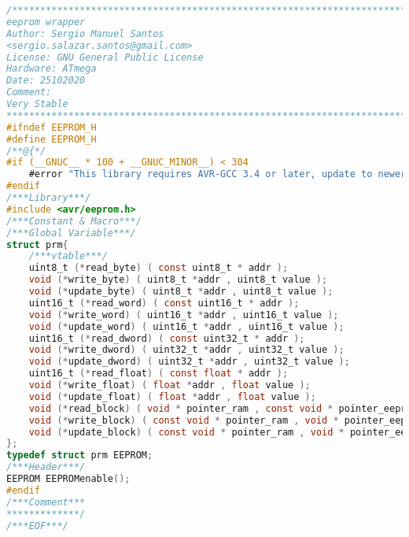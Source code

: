 \begin{lstlisting}[language=C]
/*************************************************************************
eeprom wrapper
Author: Sergio Manuel Santos
<sergio.salazar.santos@gmail.com>
License: GNU General Public License
Hardware: ATmega
Date: 25102020
Comment:
Very Stable
*************************************************************************/
#ifndef EEPROM_H
#define EEPROM_H
/**@{*/
#if (__GNUC__ * 100 + __GNUC_MINOR__) < 304
	#error "This library requires AVR-GCC 3.4 or later, update to newer AVR-GCC compiler !"
#endif
/***Library***/
#include <avr/eeprom.h>
/***Constant & Macro***/
/***Global Variable***/
struct prm{
	/***vtable***/
	uint8_t (*read_byte) ( const uint8_t * addr );
	void (*write_byte) ( uint8_t *addr , uint8_t value );
	void (*update_byte) ( uint8_t *addr , uint8_t value );
	uint16_t (*read_word) ( const uint16_t * addr );
	void (*write_word) ( uint16_t *addr , uint16_t value );
	void (*update_word) ( uint16_t *addr , uint16_t value );
	uint16_t (*read_dword) ( const uint32_t * addr );
	void (*write_dword) ( uint32_t *addr , uint32_t value );
	void (*update_dword) ( uint32_t *addr , uint32_t value );
	uint16_t (*read_float) ( const float * addr );
	void (*write_float) ( float *addr , float value );
	void (*update_float) ( float *addr , float value );
	void (*read_block) ( void * pointer_ram , const void * pointer_eeprom , size_t n);
	void (*write_block) ( const void * pointer_ram , void * pointer_eeprom , size_t n);
	void (*update_block) ( const void * pointer_ram , void * pointer_eeprom , size_t n);
};
typedef struct prm EEPROM;
/***Header***/
EEPROM EEPROMenable();
#endif
/***Comment***
*************/
/***EOF***/
\end{lstlisting}
